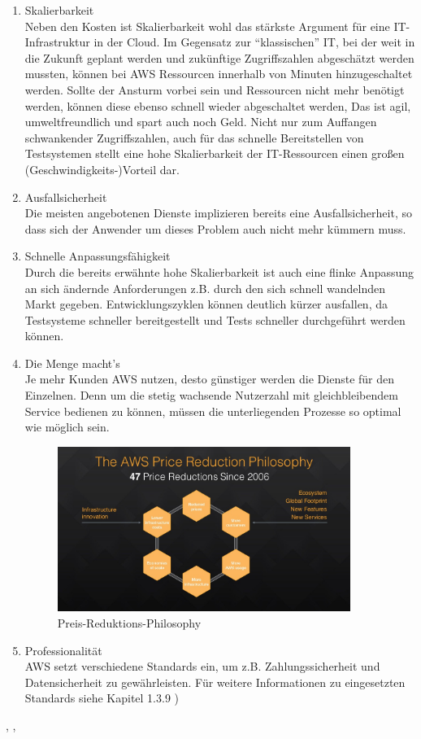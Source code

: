 \begin{enumerate}
  \item Skalierbarkeit
  \\ Neben den Kosten ist Skalierbarkeit wohl das stärkste Argument für eine IT-Infrastruktur in der Cloud. Im Gegensatz zur "`klassischen"' IT, bei der weit in die Zukunft geplant werden und zukünftige Zugriffszahlen abgeschätzt werden mussten, können bei AWS Ressourcen innerhalb von Minuten hinzugeschaltet werden. Sollte der Ansturm vorbei sein und Ressourcen nicht mehr benötigt werden, können diese ebenso schnell wieder abgeschaltet werden, Das ist agil, umweltfreundlich und spart auch noch Geld. Nicht nur zum Auffangen schwankender Zugriffszahlen, auch für das schnelle Bereitstellen von Testsystemen stellt eine hohe Skalierbarkeit der IT-Ressourcen einen großen (Geschwindigkeits-)Vorteil dar.
  \item Ausfallsicherheit
  \\ Die meisten angebotenen Dienste implizieren bereits eine Ausfallsicherheit, so dass sich der Anwender um dieses Problem auch nicht mehr kümmern muss.
  \item Schnelle Anpassungsfähigkeit
  \\ Durch die bereits erwähnte hohe Skalierbarkeit ist auch eine flinke Anpassung an sich ändernde Anforderungen z.B. durch den sich schnell wandelnden Markt gegeben. Entwicklungszyklen können deutlich kürzer ausfallen, da Testsysteme schneller bereitgestellt und Tests schneller durchgeführt werden können.
  \item Die Menge macht's
  \\ Je mehr Kunden AWS nutzen, desto günstiger werden die Dienste für den Einzelnen. Denn um die stetig wachsende Nutzerzahl mit gleichbleibendem Service bedienen zu können, müssen die unterliegenden Prozesse so optimal wie möglich sein.
  \begin{figure}[!ht]
    \centering
    \includegraphics[width=0.9\textwidth]{images/price-reduction.jpg}
    \caption{Preis-Reduktions-Philosophy \cite{aws:insider}}
  \end{figure}
  \item Professionalität
  \\ AWS setzt verschiedene Standards ein, um z.B. Zahlungssicherheit und Datensicherheit zu gewährleisten. Für weitere Informationen zu eingesetzten Standards siehe Kapitel 1.3.9 \cite{wittig:awsinaction})
\end{enumerate} \cite{aws:insider}, \cite{wittig:awsinaction}, \cite{vliet:programmingec2}


